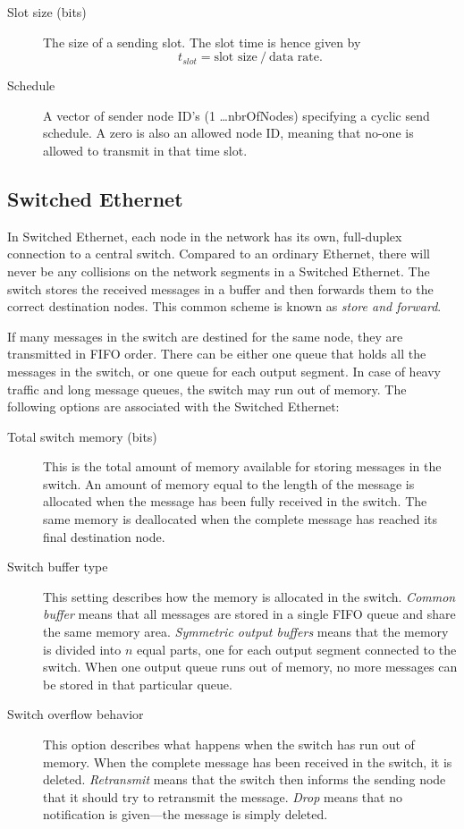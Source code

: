 \documentclass[final,twoside]{rapport}
\begin{document}
\begin{description}
\item[Slot size (bits)] The size of a sending slot. The slot time is
  hence given by 
\[
t_\mathit{slot} = \text{slot size} \ / \ \text{data rate}.
\]
\item[Schedule] A vector of sender node ID's (1 \ldots nbrOfNodes) specifying a
cyclic send schedule. A zero is also an allowed node ID, meaning that
no-one is allowed to transmit in that time slot.
\end{description}

\subsection{Switched Ethernet}
In Switched Ethernet, each node in the network has its own,
full-duplex connection to a central switch. Compared to an ordinary
Ethernet, there will never be any collisions on the network segments
in a Switched Ethernet. The switch stores the received messages in a
buffer and then forwards them to the correct destination nodes. This
common scheme is known as {\em store and forward}.

If many messages in the switch are destined for the same node, they
are transmitted in FIFO order. There can be either one queue that
holds all the messages in the switch, or one queue for each output
segment. In case of heavy traffic and long message queues, the switch
may run out of memory. The following options are associated with the
Switched Ethernet:
\begin{description}
\item[Total switch memory (bits)] This is the total amount of memory
  available for storing messages in the switch. An amount of memory
  equal to the length of the message is allocated when the message has
  been fully received in the switch. The same memory is deallocated
  when the complete message has reached its final destination node.
\item[Switch buffer type] This setting describes how the memory is
  allocated in the switch. {\em Common buffer} means that all messages
  are stored in a single FIFO queue and share the same memory area.
  {\em Symmetric output buffers} means that the memory is divided into
  $n$ equal parts, one for each output segment connected to the
  switch. When one output queue runs out of memory, no more messages
  can be stored in that particular queue.
\item[Switch overflow behavior] This option describes what happens
  when the \linebreak switch has run out of memory. When the complete
  message has been received in the switch, it is deleted. {\em
    Retransmit} means that the switch then informs the sending node
  that it should try to retransmit the message. {\em Drop} means that
  no notification is given---the message is simply deleted.
\end{description}
\end{document}
